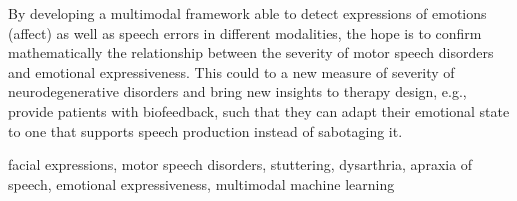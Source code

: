 By developing a multimodal framework able to detect expressions of emotions (affect) as well as speech errors in different modalities, the hope is to confirm mathematically the relationship between the severity of motor speech disorders and emotional expressiveness. This could to a new measure of severity of neurodegenerative disorders and bring new insights to therapy design, e.g., provide patients with biofeedback, such that they can adapt their emotional state to one that supports speech production instead of
sabotaging it. 



\begin{comment}
By understanding the relationship between the severity of motor speech disorders and the expressed emotions of an individual, the
hope is to provide caregivers insights of the inner emotional state of the patient which otherwise would be difficult to perceive, and to
provide patients with biofeedback, such that they can adapt their emotional state to one that supports speech production instead of
sabotaging it.
\end{comment}

\begin{keywords}
facial expressions, motor speech disorders, stuttering, dysarthria, apraxia of speech, emotional expressiveness, multimodal machine learning 
\end{keywords} 



\begin{comment}
The abstract should not exceed one page and should answer the following questions:

\begin{itemize}
	\item What's the problem?
	\item Why is it interesting?
	\item What's the solution?
	\item What follows from the solution?
\end{itemize}
\end{comment}